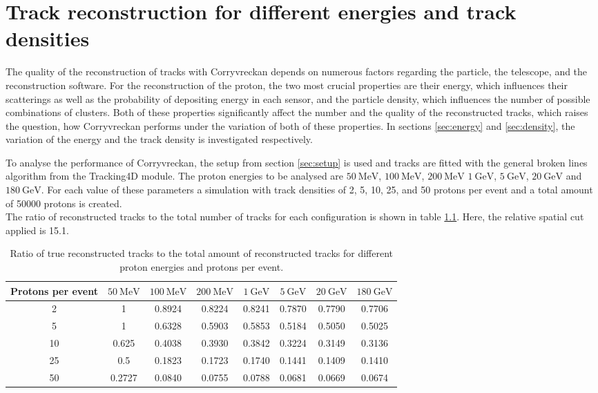 \chapter{Track reconstruction for different energies and track densities}
The quality of the reconstruction of tracks with Corryvreckan depends on numerous factors regarding the particle, the telescope, and the reconstruction software.
For the reconstruction of the proton, the two most crucial properties are their energy, which influences their scatterings as well as the probability of
depositing energy in each sensor, and the particle density, which influences the number of possible combinations of clusters.
Both of these properties significantly affect the number and the quality of the reconstructed tracks, which raises the question, how Corryvreckan performs
under the variation of both of these properties.
In sections \ref{sec:energy} and \ref{sec:density}, the variation of the energy and the track density is investigated respectively.

To analyse the performance of Corryvreckan, the setup from section \ref{sec:setup} is used and tracks are fitted with the general broken lines algorithm from the Tracking4D module.
The proton energies to be analysed are $\SI{50}{\mega\eV}$, $\SI{100}{\mega\eV}$, $\SI{200}{\mega\eV}$
$\SI{1}{\giga\eV}$, $\SI{5}{\giga\eV}$, $\SI{20}{\giga\eV}$ and $\SI{180}{\giga\eV}$. For each value of these parameters a simulation with track densities
of 2, 5, 10, 25, and 50 protons per event and a total amount of 50000 protons is created. \\
The ratio of reconstructed tracks to the total number of tracks for each configuration is shown in table \ref{tab:study}. Here, the relative spatial cut applied is 15.1.


\begin{table}
  \centering
  \begin{tabular}{c | c c c c c c c}
    \toprule
     Protons per event &  $\SI{50}{\mega\eV}$ & $\SI{100}{\mega\eV}$ & $\SI{200}{\mega\eV}$ & $\SI{1}{\giga\eV}$ & $\SI{5}{\giga\eV}$ & $\SI{20}{\giga\eV}$ & $\SI{180}{\giga\eV}$ \\
    \midrule
     2   & 1 & 0.8924 & 0.8224 & 0.8241 & 0.7870 & 0.7790 & 0.7706  \\
     5   & 1 & 0.6328 & 0.5903 & 0.5853 & 0.5184 & 0.5050 & 0.5025  \\
     10  & 0.625 & 0.4038 & 0.3930 & 0.3842 & 0.3224 & 0.3149 & 0.3136  \\
     25  & 0.5 & 0.1823 & 0.1723 & 0.1740 & 0.1441 & 0.1409 & 0.1410  \\
     50  & 0.2727 & 0.0840 & 0.0755 & 0.0788 & 0.0681 & 0.0669 & 0.0674  \\
  \end{tabular}
  \caption{Ratio of true reconstructed tracks to the total amount of reconstructed tracks for different proton energies and protons per event.}
  \label{tab:study}
\end{table}

